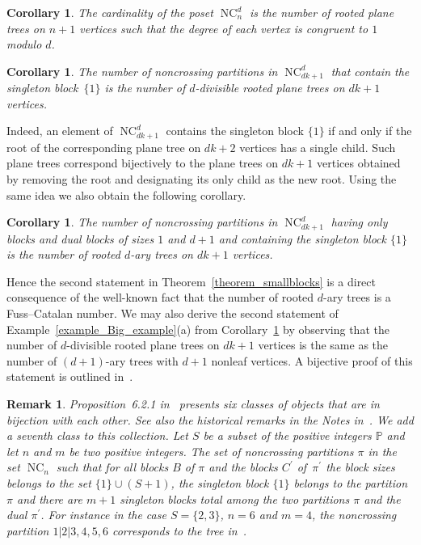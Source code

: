 \documentclass[11pt]{amsart}
\newtheorem{remark}[theorem]{Remark}
\newtheorem{corollary}[theorem]{Corollary}
\numberwithin{equation}{section}
\newcommand{\Ppp}{{\mathbb P}}
\DeclareMathOperator{\NC}{NC}
\begin{document}
\begin{corollary}
The cardinality of the poset $\NC^{d}_{n}$ is
the number of rooted plane trees on $n+1$ vertices
such that the degree of each vertex is congruent to $1$ modulo $d$.
\end{corollary}  
\begin{corollary}
\label{corollary_bigblocks}  
The number of noncrossing partitions in $\NC^{d}_{dk+1}$
that contain the singleton block~$\{1\}$ is the number of $d$-divisible
rooted plane trees on $dk+1$ vertices.
\end{corollary}  
Indeed, an element of $\NC^{d}_{dk+1}$ contains the singleton block
$\{1\}$ if and only if the root of the corresponding plane tree on
$dk+2$ vertices has a single child. Such plane trees correspond
bijectively to the plane trees on $dk+1$ vertices obtained by removing
the root and designating its only child as the new root. Using the same
idea we also obtain the following corollary.
\begin{corollary}
\label{corollary_smallblocks}    
The number of noncrossing partitions in $\NC^{d}_{dk+1}$ having only
blocks and dual blocks of sizes $1$ and $d+1$ and 
containing the singleton block $\{1\}$ is the number of rooted $d$-ary
trees on $dk+1$ vertices. 
\end{corollary}
Hence the second statement in Theorem~\ref{theorem_smallblocks} is a
direct consequence of the well-known fact that the number of rooted
$d$-ary trees is a Fuss--Catalan number. We may also derive the second
statement of 
Example~\ref{example_Big_example}(a)
from
Corollary~\ref{corollary_bigblocks}  by observing that the number of
$d$-divisible rooted plane trees on $dk+1$ vertices is the same as the
number of $(d+1)$-ary trees with $d+1$ nonleaf vertices. A bijective
proof of this statement is outlined
in~\cite[Remark~4.2]{Muhle_Nadeau_Williams}.  

  

\begin{remark}
{\rm
Proposition~6.2.1 in~\cite{Stanley_EC2}
presents six classes of objects that are in bijection with each other.
See also the historical remarks in the Notes in~\cite[Chapter~6]{Stanley_EC2}.
We add a seventh class to this collection.
Let $S$ be a subset of the positive integers $\Ppp$
and let $n$ and $m$ be two positive integers.
The set of noncrossing partitions $\pi$ in the set $\NC_{n}$ such that
for all blocks $B$ of $\pi$ and the blocks $C^{\prime}$ of~$\pi^{\prime}$
the block sizes belongs
to the set $\{1\} \cup (S+1)$,
the singleton block $\{1\}$ belongs to the partition $\pi$
and
there are $m+1$ singleton blocks total among the two 
partitions $\pi$ and the dual $\pi^{\prime}$.
For instance in the case $S = \{2,3\}$, $n=6$ and $m=4$, the noncrossing partition $1|2|3,4,5,6$
corresponds to the tree in~\cite[Proposition~6.2.1, part~(i)]{Stanley_EC2}.
}
\end{remark}
\end{document}
